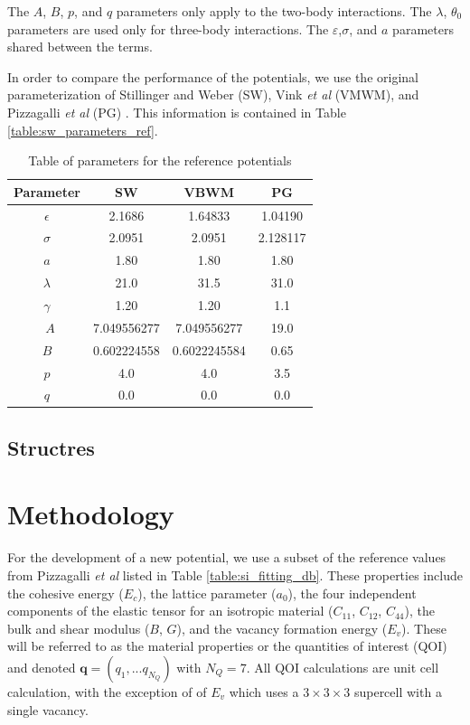 The $A$, $B$, $p$, and $q$ parameters only apply to the two-body interactions.
The $\lambda$, $\theta_0$ parameters are used only for three-body interactions.
The $\varepsilon$,$\sigma$, and $a$ parameters shared between the terms.

In order to compare the performance of the potentials, we use the original parameterization of Stillinger and Weber (SW)\cite{stillinger1985_sw}, Vink \emph{et al} (VMWM)\cite{vink2001_sw_Si}, and Pizzagalli \emph{et al} (PG) \cite{pizzagalli2013_sw_Si}.  This information is contained in Table \ref{table:sw_parameters_ref}.

\begin{table}[ht]
	\centering
	\caption{Table of parameters for the reference potentials}
	\label{tbl:sw_parameters_ref}
	\begin{tabular}{c c c c}
		\hline
		Parameter & SW & VBWM & PG \\
		\hline
		$\epsilon$ & 2.1686 & 1.64833 & 1.04190 \\
		$\sigma$ &   2.0951 & 2.0951 & 2.128117 \\
		$a$ &       1.80 & 1.80 & 1.80 \\
		$\lambda$ & 21.0 & 31.5 & 31.0 \\
		$\gamma$ & 1.20 & 1.20 & 1.1 \\\
		$A$ & 7.049556277 & 7.049556277 & 19.0 \\
		$B$ & 0.602224558 & 0.6022245584 & 0.65 \\
		$p$ & 4.0 & 4.0 & 3.5 \\
		$q$ & 0.0 & 0.0 & 0.0 \\
		\hline
	\end{tabular}
\end{table}

\subsection{Structres}
\label{sub:software_structure}



\section{Methodology}

For the development of a new potential, we use a subset of the reference values from Pizzagalli \emph{et al} \cite{pizzagalli2013_sw_Si} listed in Table \ref{table:si_fitting_db}.  These properties include the cohesive energy ($E_c$), the lattice parameter ($a_0$), the four independent components of the elastic tensor for an isotropic material ($C_{11}$, $C_{12}$, $C_{44}$), the bulk and shear modulus ($B$, $G$), and the vacancy formation energy ($E_v$).
These will be referred to as the material properties or the quantities of interest (QOI) and denoted $\bm{q}=(q_1,...q_{N_Q})$ with $N_Q = 7$.
All QOI calculations are unit cell calculation, with the exception of of $E_v$ which uses a $3 \times 3 \times 3$ supercell with a single vacancy.

